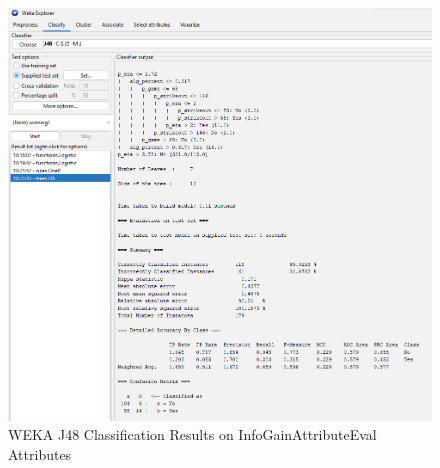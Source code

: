 \documentclass[12pt]{article}
\begin{document}
\begin{figure}[h!]
    \includegraphics[scale=0.4]{./images/InfoGainAttributeEval/J48-Summary.png}
\centering
    \caption{WEKA J48 Classification Results on InfoGainAttributeEval Attributes}
\end{figure}

\newpage 
\end{document}
